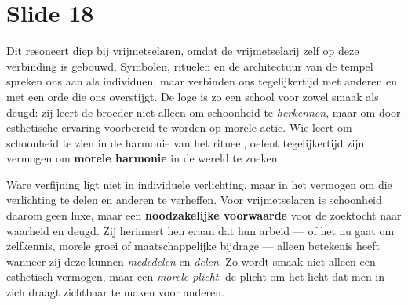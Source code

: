 \documentclass{article}
\begin{document}
\section*{Slide 18}

Dit resoneert diep bij vrijmetselaren, omdat de vrijmetselarij zelf op deze verbinding is gebouwd. Symbolen, rituelen en de architectuur van de tempel spreken ons aan als individuen, maar verbinden ons tegelijkertijd met anderen en met een orde die ons overstijgt. De loge is zo een school voor zowel smaak als deugd: zij leert de broeder niet alleen om schoonheid te \textit{herkennen}, maar om door esthetische ervaring voorbereid te worden op morele actie. Wie leert om schoonheid te zien in de harmonie van het ritueel, oefent tegelijkertijd zijn vermogen om \textbf{morele harmonie} in de wereld te zoeken.

Ware verfijning ligt niet in individuele verlichting, maar in het vermogen om die verlichting te delen en anderen te verheffen. Voor vrijmetselaren is schoonheid daarom geen luxe, maar een \textbf{noodzakelijke voorwaarde} voor de zoektocht naar waarheid en deugd. Zij herinnert hen eraan dat hun arbeid — of het nu gaat om zelfkennis, morele groei of maatschappelijke bijdrage — alleen betekenis heeft wanneer zij deze kunnen \textit{mededelen} en \textit{delen}. Zo wordt smaak niet alleen een esthetisch vermogen, maar een \textit{morele plicht}: de plicht om het licht dat men in zich draagt zichtbaar te maken voor anderen.
\end{document}
